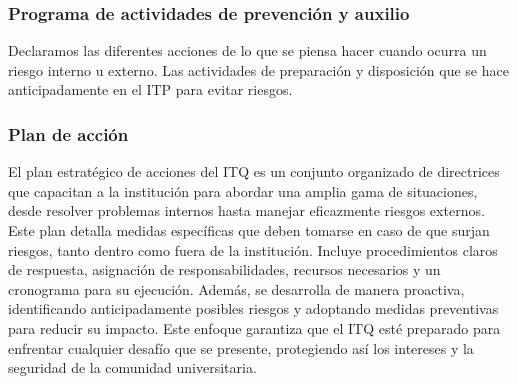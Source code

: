     \subsubsection{Programa de actividades de prevención y auxilio}
    
    Declaramos las diferentes acciones de lo que se piensa hacer cuando ocurra un riesgo interno u externo. 
    Las actividades de preparación y disposición que se hace anticipadamente en el ITP para evitar riesgos.
    \subsubsection{Plan de acción}
    
    El plan estratégico de acciones del ITQ es un conjunto organizado de directrices que capacitan a la institución para abordar una amplia gama de situaciones, desde resolver problemas internos hasta manejar eficazmente riesgos externos. Este plan detalla medidas específicas que deben tomarse en caso de que surjan riesgos, tanto dentro como fuera de la institución. Incluye procedimientos claros de respuesta, asignación de responsabilidades, recursos necesarios y un cronograma para su ejecución. Además, se desarrolla de manera proactiva, identificando anticipadamente posibles riesgos y adoptando medidas preventivas para reducir su impacto. Este enfoque garantiza que el ITQ esté preparado para enfrentar cualquier desafío que se presente, protegiendo así los intereses y la seguridad de la comunidad universitaria.
